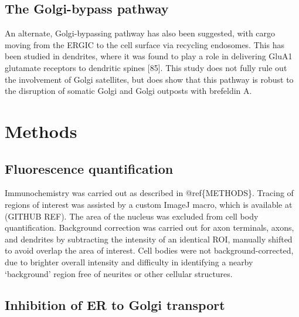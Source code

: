\documentclass[
  12pt,
  a4paper,
]{book}
\begin{document}
\hypertarget{the-golgi-bypass-pathway}{%
\subsection{The Golgi-bypass pathway}\label{the-golgi-bypass-pathway}}

An alternate, Golgi-bypassing pathway has also been suggested, with cargo moving from the ERGIC to the cell surface via recycling endosomes. This has been studied in dendrites, where it was found to play a role in delivering GluA1 glutamate receptors to dendritic spines {[}85{]}. This study does not fully rule out the involvement of Golgi satellites, but does show that this pathway is robust to the disruption of somatic Golgi and Golgi outposts with brefeldin A.

\hypertarget{methods-2}{%
\section{Methods}\label{methods-2}}

\hypertarget{fluorescence-quantification-1}{%
\subsection{Fluorescence quantification}\label{fluorescence-quantification-1}}

Immunochemistry was carried out as described in @ref\{METHODS\}. Tracing of regions of interest was assisted by a custom ImageJ macro, which is available at (GITHUB REF). The area of the nucleus was excluded from cell body quantification. Background correction was carried out for axon terminals, axons, and dendrites by subtracting the intensity of an identical ROI, manually shifted to avoid overlap the area of interest. Cell bodies were not background-corrected, due to brighter overall intensity and difficulty in identifying a nearby `background' region free of neurites or other cellular structures.

\hypertarget{inhibition-of-er-to-golgi-transport}{%
\subsection{Inhibition of ER to Golgi transport}\label{inhibition-of-er-to-golgi-transport}}
\end{document}
